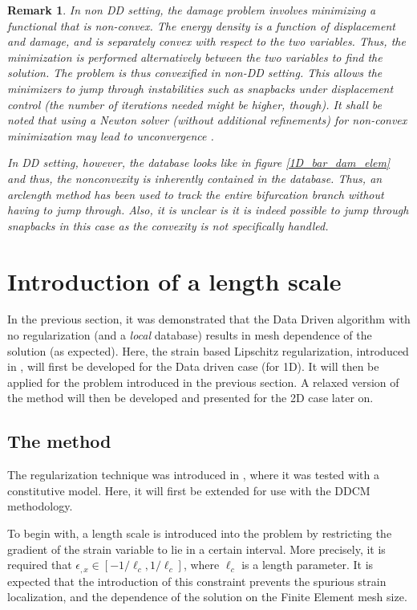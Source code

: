 \documentclass[10pt]{elsarticle}
\newtheorem*{remark}{Remark}
\begin{document}
\begin{remark}
	In non DD setting, the damage problem involves minimizing a functional that is non-convex. The energy density is a function of displacement and damage, and is separately convex with respect to the two variables. Thus, the minimization is performed alternatively between the two variables to find the solution. The problem is thus \textit{convexified} in non-DD setting. This allows the minimizers to \textit{jump through} instabilities such as snapbacks under displacement control (the number of iterations needed might be higher, though). It shall be noted that using a Newton solver (without additional refinements) for non-convex minimization may lead to unconvergence \cite{Farrell2017,Gerasimov2016}.
	
	In DD setting, however, the database looks like in figure \ref{1D_bar_dam_elem} and thus, the nonconvexity is inherently contained in the database. Thus, an arclength method has been used to track the entire bifurcation branch without having to jump through. Also, it is unclear is it is indeed possible to jump through snapbacks in this case as the convexity is not specifically handled. 
\end{remark}

\section{Introduction of a length scale}

In the previous section, it was demonstrated that the Data Driven algorithm with no regularization (and a \textit{local} database) results in mesh dependence of the solution (as expected). Here, the strain based Lipschitz regularization, introduced in \cite{Kamasamudram2023}, will first be developed for the Data driven case (for 1D). It will then be applied for the problem introduced in the previous section. A relaxed version of the method will then be developed and presented for the 2D case later on.

\subsection{The method}
The regularization technique was introduced in \cite{Kamasamudram2023}, where it was tested with a constitutive model. Here, it will first be extended for use with the DDCM methodology.

To begin with, a length scale is introduced into the problem by restricting the gradient of the strain variable to lie in a certain interval. More precisely, it is required that $\epsilon_{,x} \in [-1/{\ell_c}, 1/{\ell_c} ]$, where $\ell_c$ is a length parameter. It is expected that the introduction of this constraint prevents the spurious strain localization, and the dependence of the solution on the Finite Element mesh size. 
\end{document}
